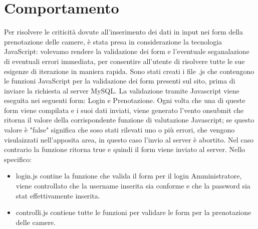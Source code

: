 \section{Comportamento} %
Per risolvere le criticità dovute all'inserimento dei dati in input nei form della prenotazione delle camere, è stata presa in considerazione la tecnologia JavaScript: volevamo rendere la validazione dei form e l'eventuale seganalazione di eventuali errori immediata, per consentire all'utente di risolvere tutte le sue esigenze di iterazione in maniera rapida.
Sono stati creati i file .js che contengono le funzioni JavaScript per la validazione dei form presenti sul sito, prima di inviare la richiesta al server MySQL. La validazione tramite Javascript viene eseguita nei seguenti form: Login e Prenotazione. Ogni volta che una di queste form viene compilata e i suoi dati inviati, viene generato l'vento onsubmit che ritorna il valore della corrispondente funzione di valutazione Javascript; se questo valore è "false" significa che soso stati rilevati uno o più errori, che vengono visulaizzati nell'apposita area, in questo caso l'invio al server è abortito. Nel caso contrario la funzione ritorna true e quindi il form viene inviato al server.
Nello specifico:
\begin{itemize}
	\item login.js contine la funzione che valida il form per il login Amministratore, viene controllato che la username inserita sia conforme e che la password sia stat effettivamente inserita.
	\item controlli.js contiene tutte le funzioni per validare le form per la prenotazione delle camere.
\end{itemize}